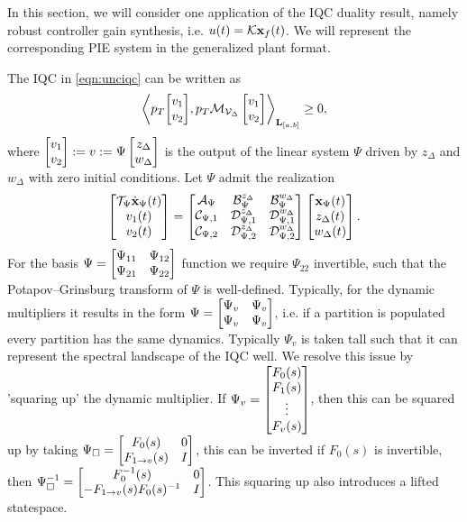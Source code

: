 In this section, we will consider one application of the IQC duality result,
namely robust controller gain synthesis, i.e.
$u(t) = \mathcal{K}\mathbf{x}_f(t)$. We will represent the corresponding PIE system in
the generalized plant format.

The IQC in \eqref{eqn:unciqc} can be written as
\[
	\left\langle p_T {\begin{bmatrix}v_1\\v_2\end{bmatrix}}, p_T \mathcal{M}_{\mathcal{V}_\Delta}
		\begin{bmatrix}v_1\\v_2\end{bmatrix} \right\rangle_{\mathbf{L}_{[a,b]}} \ge 0,
\]
where \(\begin{bmatrix}v_1\\v_2\end{bmatrix}:=v:=\Psi\begin{bmatrix}z_\Delta \\ w_\Delta\end{bmatrix}\) is the output of the linear system
\(\Psi\) driven by \(z_\Delta\) and \(w_\Delta\) with zero initial conditions.
Let \(\Psi\) admit the realization
\begin{equation}
	\begin{bmatrix}\mathcal{T}_\Psi \dot{\mathbf{x}}_\Psi(t) \\ v_1(t)\\v_2(t)\end{bmatrix}
	=
	\begin{bmatrix}\mathcal{A}_\Psi & \mathcal{B}_\Psi^{z_\Delta} & \mathcal{B}_\Psi^{w_\Delta} \\
		\mathcal{C}_{\Psi,1} & \mathcal{D}_{\Psi,1}^{z_\Delta} & \mathcal{D}_{\Psi,1}^{w_\Delta}\\
		\mathcal{C}_{\Psi,2} & \mathcal{D}_{\Psi,2}^{z_\Delta} & \mathcal{D}_{\Psi,2}^{w_\Delta}\end{bmatrix}
	\begin{bmatrix}\mathbf{x}_\Psi(t) \\ z_\Delta(t) \\ w_\Delta(t)\end{bmatrix}.
\end{equation}
For the basis $\Psi = \begin{bmatrix}\Psi_{11} & \Psi_{12} \\ \Psi_{21} & \Psi_{22}\end{bmatrix}$ function we require $\Psi_{22}$ invertible,
such that the Potapov--Grinsburg transform of \(\Psi\) is well-defined. Typically, for the dynamic multipliers it results in the form
$\Psi =\begin{bmatrix}\Psi_{v} & \Psi_{v}\\ \Psi_{v} & \Psi_{v}\end{bmatrix}$, i.e. if a partition is populated every partition has the same dynamics.
Typically $\Psi_{v}$ is taken tall such that it can represent the spectral landscape of the IQC well. We resolve this issue by 
'squaring up' the dynamic multiplier. If $\Psi_{v} = \begin{bmatrix}F_0(s) \\ F_1(s) \\ \vdots \\ F_v(s)\end{bmatrix}$, then this
can be squared up by taking $\Psi_\square = \begin{bmatrix}F_0(s) & 0\\ F_{1\to v}(s) & I\end{bmatrix}$, this can be inverted if $F_0(s)$ is invertible,
then $\Psi_\square^{-1} = \begin{bmatrix}F_0^{-1}(s) & 0\\ -F_{1\to v}(s)F_0(s)^{-1} & I\end{bmatrix}$. This squaring up also introduces a lifted statespace.
